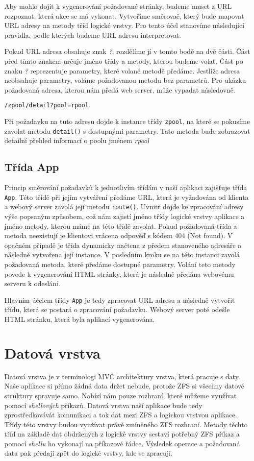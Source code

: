 Aby mohlo dojít k vygenerování požadované stránky, budeme muset z URL rozpoznat, která akce se má vykonat. Vytvoříme směrovač, který bude mapovat URL adresy na metody tříd logické vrstvy. Pro tento účel stanovíme následující pravidla, podle kterých budeme URL adresu interpretovat.

Pokud URL adresa obsahuje znak \emph{?}, rozdělíme jí v tomto bodě na dvě části. Část před tímto znakem určuje jméno třídy a metody, kterou budeme volat. Část po znaku \emph{?} reprezentuje parametry, které volané metodě předáme. Jestliže adresa neobsahuje parametry, voláme požadovanou metodu bez parametrů. Pro ukázku požadovaná adresa, kterou nám předá web server, může vypadat následovně.
\begin{verbatim}
/zpool/detail?pool=rpool
\end{verbatim}
Při požadavku na tuto adresu dojde k instance třídy \verb|zpool|, na které se pokusíme zavolat metodu \verb|detail()| s dostupnými parametry. Tato metoda bude zobrazovat detailní přehled informací o poolu jménem \emph{rpool}
    \subsection{Třída App}
    Princip směrování požadavků k jednotlivím třídám v naší aplikaci zajišťuje třída \verb|App|. Této třídě při jejím vytváření předáme URL, která je vyžadována od klienta a webový server zavolá její metodu \verb|route()|. Uvnitř dojde ke zpracování adresy výše popsaným způsobem, což nám zajistí jméno třídy logické vrstvy aplikace a jméno metody, kterou máme na této třídě zavolat. Pokud požadovaná třída a metoda neexistují je klientovi vrácena odpověď s kódem 404 (Not found). V opačném případě je třída dynamicky načtena z předem stanoveného adresáře a následně vytvořena její instance. V posledním kroku se na této instanci zavolá požadovaná metoda, které předáme dostupné parametry. Volání teto metody povede k vygenerování HTML stránky, která je následně předána webovému serveru k odeslání.

    Hlavním účelem třídy \verb|App| je tedy zpracovat URL adresu a následně vytvořit třídu, která se postará o zpracování požadavku. Webový server poté odešle HTML stránku, která byla aplikací vygenerována.

\section{Datová vrstva}
Datová vrstva je v terminologi MVC architektury vrstva, která pracuje s daty. Naše aplikace si přímo žádná data držet nebude, protože ZFS si všechny datové struktury spravuje samo. Nabízí nám pouze rozhraní, které můžeme využívat pomocí \emph{shellových} příkazů. Datová vrstva naší aplikace bude tedy zprostředkovávát komunikaci a tok dat mezi ZFS a logickou vrstvou aplikace. Třídy této vrstvy budou využívat právě zmíněného ZFS rozhraní. Metody těchto tříd na základě dat obdržených z logické vrstvy sestaví potřebný ZFS příkaz a pomocí \emph{shellu} ho vykonají na příkazové řádce. Výsledek operace a požadovaná data pak předají zpět do logické vrstvy, kde se zpracují.

